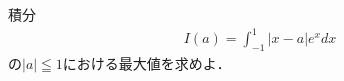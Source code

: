 \documentclass[../../main.tex]{subfiles}
\begin{document}
積分
\begin{align}
  I(a)=\int_{-1}^1|x-a|e^xdx
\end{align}
の$|a|\leqq1$における最大値を求めよ．
\end{document}

